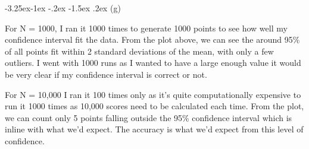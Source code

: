 \documentclass[10pt]{article} %
\makeatletter
\renewcommand\subsection{\@startsection{subsection}{2}{\z@}%
                                     {-3.25ex\@plus -1ex \@minus -.2ex}%
                                     {-1.5ex \@plus .2ex}%
                                     {\normalfont\large\bfseries}}
\makeatother
\begin{document}
\subsection{(g)}
\begin{figure}[h]
\centering

    \label{fig:example}
\end{figure}
For N = 1000, I ran it 1000 times to generate 1000 points to see how well my confidence interval fit the data. From the plot above, we can see the around 95\% of all points fit within 2 standard deviations of the mean, with only a few outliers. I went with 1000 runs as I wanted to have a large enough value it would be very clear if my confidence interval is correct or not.
\begin{figure}[h]
\centering

    \label{fig:example}
\end{figure}
\newline
For N = 10,000 I ran it 100 times only as it's quite computationally expensive to run it 1000 times as 10,000 scores need to be calculated each time. From the plot, we can count only 5 points falling outside the 95\% confidence interval which is inline with what we'd expect. The accuracy is what we'd expect from this level of confidence. 
\end{document}
